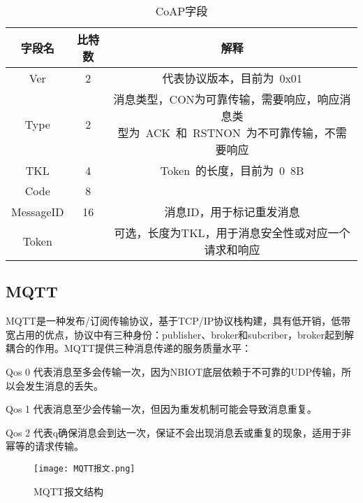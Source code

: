   
\begin{table}[h!]
\caption{CoAP字段}
\begin{tabular}{ccc}
\toprule
字段名 & 比特数 & 解释\\
\midrule
Ver&2&代表协议版本，目前为 0x01 \\
Type&2&\makecell[c]{消息类型，CON为可靠传输，需要响应，响应消息类\\型为 ACK 和 RSTNON 为不可靠传输，不需要响应}\\
TKL&4&Token 的长度，目前为 0~8B \\ 
Code&8&	\\
MessageID&16&消息ID，用于标记重发消息\\
Token&&可选，长度为TKL，用于消息安全性或对应一个请求和响应\\
\bottomrule
\end{tabular}
\label{coap字段}
\end{table}


\subsection{MQTT}

MQTT是一种发布/订阅传输协议，基于TCP/IP协议栈构建，具有低开销，低带宽占用的优点，协议中有三种身份：publisher、broker和subcriber，broker起到解耦合的作用。MQTT提供三种消息传递的服务质量水平：

Qos 0 代表消息至多会传输一次，因为NBIOT底层依赖于不可靠的UDP传输，所以会发生消息的丢失。

Qos 1 代表消息至少会传输一次，但因为重发机制可能会导致消息重复。

Qos 2 代表q确保消息会到达一次，保证不会出现消息丢或重复的现象，适用于非幂等的请求传输。




\begin{figure}[h]
	\texttt{[image: MQTT报文.png]}
	\caption{MQTT报文结构}
	\label{MQTT报文}
\end{figure}


